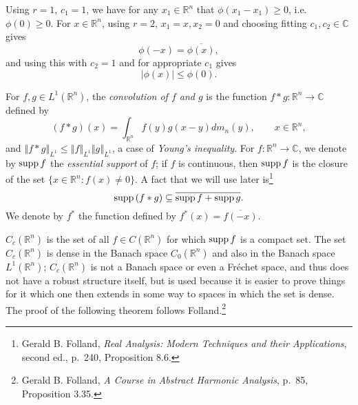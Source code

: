 \documentclass{article}
\newcommand{\supp}{\ensuremath\mathrm{supp}\,}
\newcommand{\norm}[1]{\left\Vert #1 \right\Vert}
\theoremstyle{definition}
\theoremstyle{definition}
\begin{document}
Using $r=1$, $c_1=1$, we have for any $x_1 \in \mathbb{R}^n$ that $\phi(x_1-x_1) \geq 0$, i.e. $\phi(0) \geq 0$. For $x \in \mathbb{R}^n$,
using $r=2$, $x_1=x, x_2=0$ and choosing fitting  $c_1,c_2 \in \mathbb{C}$ gives
\[
\phi(-x)=\overline{\phi(x)},
\]
and using this with $c_2=1$ and for appropriate $c_1$ gives
\[
|\phi(x)| \leq \phi(0).
\]

For $f,g \in L^1(\mathbb{R}^n)$, the {\em convolution of $f$ and $g$} is the function $f*g:\mathbb{R}^n \to \mathbb{C}$ defined by
\[
(f*g)(x) = \int_{\mathbb{R}^n} f(y)g(x-y) dm_n(y), \qquad x \in \mathbb{R}^n,
\]
and $\norm{f*g}_{L^1} \leq \norm{f}_{L^1} \norm{g}_{L^1}$, a case of {\em Young's inequality}.
For $f:\mathbb{R}^n \to \mathbb{C}$, we denote by $\supp f$ the {\em essential support} of $f$; if $f$ is continuous, then $\supp f$ is the closure of the set
$\{x \in \mathbb{R}^n: f(x) \neq 0\}$.
A fact that we will use later is\footnote{Gerald B. Folland, {\em Real
Analysis: Modern Techniques and their Applications}, second ed., p.~240, Proposition 8.6.}
\[
\supp(f*g) \subseteq \overline{\supp f + \supp g}.
\]
We denote by $f^*$ the function defined by $f^*(x)=\overline{f(-x)}$.

$C_c(\mathbb{R}^n)$ is the set of all $f \in C(\mathbb{R}^n)$ for which $\supp f$ is a compact set.
The set $C_c(\mathbb{R}^n)$ is dense in the Banach space
$C_0(\mathbb{R}^n)$  and also in the Banach space $L^1(\mathbb{R}^n)$; $C_c(\mathbb{R}^n)$ is not a Banach space or even a Fr\'echet space,
and thus does not have a robust structure itself, but is used because it is easier to prove things for it which one then extends in some way to spaces
in which the set is dense.
The proof of the following theorem
follows Folland.\footnote{Gerald B. Folland, {\em A Course in Abstract Harmonic Analysis}, p.~85, Proposition 3.35.}
\end{document}
